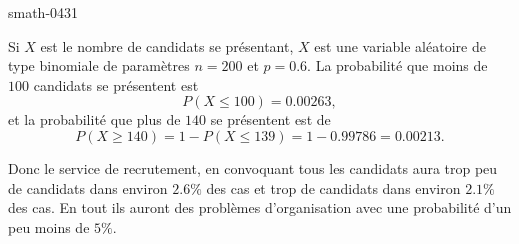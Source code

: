 
\begin{corrige}{smath-0431}

Si \( X\) est le nombre de candidats se présentant, \( X\) est une variable aléatoire de type binomiale de paramètres \( n=200\) et \( p=0.6\). La probabilité que moins de \( 100\) candidats se présentent est
    \begin{equation}
        P(X\leq 100)=0.00263,
    \end{equation}
et la probabilité que plus de \( 140\) se présentent est de 
\begin{equation}
    P(X\geq 140)=1-P(X\leq 139)=1-0.99786=0.00213.
\end{equation}

Donc le service de recrutement, en convoquant tous les candidats aura trop peu de candidats dans environ \( 2.6\%\) des cas et trop de candidats dans environ \( 2.1\%\) des cas. En tout ils auront des problèmes d'organisation avec une probabilité d'un peu moins de \( 5\%\).

\end{corrige}
